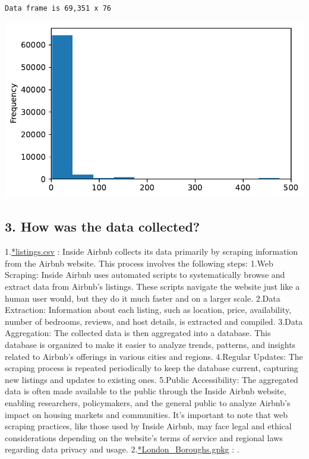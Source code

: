 \documentclass[
  a4paper,
  DIV=11,
  numbers=noendperiod]{scrartcl}
\begin{document}
\begin{verbatim}
Data frame is 69,351 x 76
\end{verbatim}

\includegraphics{Group_Work_DeskB_files/figure-pdf/cell-5-output-1.pdf}

\hypertarget{how-was-the-data-collected}{%
\subsection{3. How was the data
collected?}\label{how-was-the-data-collected}}

1.\href{http://data.insideairbnb.com/united-kingdom/england/london/2023-09-06/data/listings.csv.gz}{*listings.csv}
: Inside Airbnb collects its data primarily by scraping information from
the Airbnb website. This process involves the following steps: 1.Web
Scraping: Inside Airbnb uses automated scripts to systematically browse
and extract data from Airbnb's listings. These scripts navigate the
website just like a human user would, but they do it much faster and on
a larger scale. 2.Data Extraction: Information about each listing, such
as location, price, availability, number of bedrooms, reviews, and host
details, is extracted and compiled. 3.Data Aggregation: The collected
data is then aggregated into a database. This database is organized to
make it easier to analyze trends, patterns, and insights related to
Airbnb's offerings in various cities and regions. 4.Regular Updates: The
scraping process is repeated periodically to keep the database current,
capturing new listings and updates to existing ones. 5.Public
Accessibility: The aggregated data is often made available to the public
through the Inside Airbnb website, enabling researchers, policymakers,
and the general public to analyze Airbnb's impact on housing markets and
communities. It's important to note that web scraping practices, like
those used by Inside Airbnb, may face legal and ethical considerations
depending on the website's terms of service and regional laws regarding
data privacy and usage.
2.\href{https://data.london.gov.uk/download/london_boroughs/9502cdec-5df0-46e3-8aa1-2b5c5233a31f/London_Boroughs.gpkg}{*London\_Boroughs.gpkg}
: .
\end{document}
